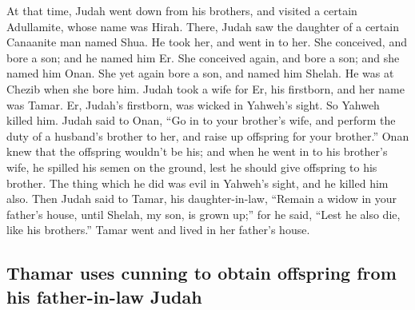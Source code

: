 \begin{paracol}{2}
\begin{otherlanguage}{english}
 At that time, Judah went down from his brothers, and
visited a certain Adullamite, whose name was Hirah. 
There, Judah saw the daughter of a certain Canaanite man named Shua. He
took her, and went in to her.  She conceived, and bore a
son; and he named him Er.  She conceived again, and bore a
son; and she named him Onan.  She yet again bore a son,
and named him Shelah. He was at Chezib when she bore him. 
Judah took a wife for Er, his firstborn, and her name was Tamar.
 Er, Judah's firstborn, was wicked in Yahweh's sight. So
Yahweh killed him.  Judah said to Onan, ``Go in to your
brother's wife, and perform the duty of a husband's brother to her, and
raise up offspring for your brother.''  Onan knew that the
offspring wouldn't be his; and when he went in to his brother's wife, he
spilled his semen on the ground, lest he should give offspring to his
brother.  The thing which he did was evil in Yahweh's
sight, and he killed him also.  Then Judah said to Tamar,
his daughter-in-law, ``Remain a widow in your father's house, until
Shelah, my son, is grown up;'' for he said, ``Lest he also die, like his
brothers.'' Tamar went and lived in her father's house.

\hypertarget{thamar-uses-cunning-to-obtain-offspring-from-his-father-in-law-judah}{%
\subsection{Thamar uses cunning to obtain offspring from his
father-in-law
Judah}\label{thamar-uses-cunning-to-obtain-offspring-from-his-father-in-law-judah}}


\end{otherlanguage}
\end{paracol}
